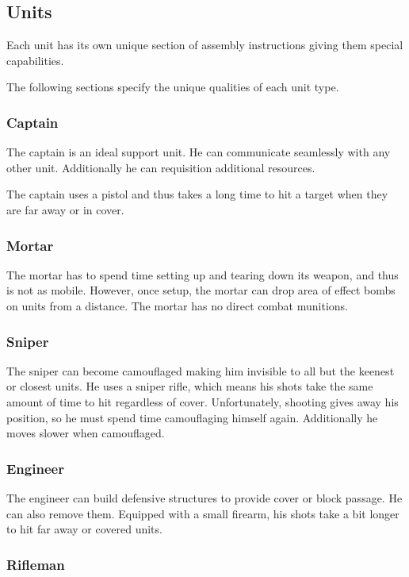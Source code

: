 \documentclass{article}
\begin{document}
\subsection*{Units}

Each unit has its own unique section of assembly instructions giving them
special capabilities.

The following sections specify the unique qualities of each unit type.

\subsubsection*{Captain}

The captain is an ideal support unit. He can communicate seamlessly with any
other unit. Additionally he can requisition additional resources.

The captain uses a pistol and thus takes a long time to hit a target when they
are far away or in cover.

\subsubsection*{Mortar}

The mortar has to spend time setting up and tearing down its weapon, and thus is
not as mobile. However, once setup, the mortar can drop area of effect bombs on
units from a distance. The mortar has no direct combat munitions.

\subsubsection*{Sniper}

The sniper can become camouflaged making him invisible to all but the keenest or
closest units. He uses a sniper rifle, which means his shots take the same
amount of time to hit regardless of cover. Unfortunately, shooting gives away
his position, so he must spend time camouflaging himself again. Additionally he
moves slower when camouflaged.

\subsubsection*{Engineer}

The engineer can build defensive structures to provide cover or block passage.
He can also remove them. Equipped with a small firearm, his shots take a bit
longer to hit far away or covered units.

\subsubsection*{Rifleman}
\end{document}
